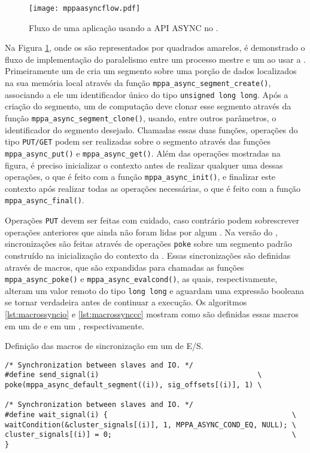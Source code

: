 \begin{figure}[tb]
  \centering
  \caption{Fluxo de uma aplicação usando a API ASYNC no \mppa.}
  \label{fig:mppaasyncflow}
  \texttt{[image: mppaasyncflow.pdf]}
\end{figure}

Na Figura \ref{fig:mppaasyncflow}, onde os \clusters são representados por quadrados amarelos, é demonstrado o fluxo de implementação do paralelismo entre um processo mestre e um \CC ao usar a \ASYNC. Primeiramente um \cluster de \IO cria um segmento sobre uma porção de dados localizados na sua memória local através da função \texttt{mppa\_async\_segment\_create()}, associando a ele um identificador único do tipo \texttt{unsigned long long}. Após a criação do segmento, um \cluster de computação deve clonar esse segmento através da função \texttt{mppa\_async\_segment\_clone()}, usando, entre outros parâmetros, o identificador do segmento desejado. Chamadas essas duas funções, operações do tipo \texttt{PUT/GET} podem ser realizadas sobre o segmento através das funções \texttt{mppa\_async\_put()} e \texttt{mppa\_async\_get()}. Além das operações mostradas na figura, é preciso inicializar o contexto antes de realizar qualquer uma dessas operações, o que é feito com a função \texttt{mppa\_async\_init()}, e finalizar este contexto após realizar todas as operações necessárias, o que é feito com a função \texttt{mppa\_async\_final()}.

Operações \texttt{PUT} devem ser feitas com cuidado, caso contrário podem sobrescrever operações anteriores que ainda não foram lidas por algum \cluster. Na versão \ASYNC do \capb, sincronizações são feitas através de operações \texttt{poke} sobre um segmento padrão construído na inicialização do contexto da \API. Essas sincronizações são definidas através de macros, que são expandidas para chamadas as funções \texttt{mppa\_async\_poke()} e \texttt{mppa\_async\_evalcond()}, as quais, respectivamente, alteram um valor remoto do tipo \texttt{long long} e aguardam uma expressão booleana se tornar verdadeira antes de continuar a execução. Os algoritmos \ref{lst:macrossyncio} e \ref{lst:macrossynccc} mostram como são definidas essas macros em um \cluster de \IO e em um \CC, respectivamente.

\begin{listing}[tb]
\caption{Definição das macros de sincronização em um \cluster de E/S.}
\label{lst:macrossyncio}
\begin{verbatim}
/* Synchronization between slaves and IO. */
#define send_signal(i)                                     \
poke(mppa_async_default_segment((i)), sig_offsets[(i)], 1) \

/* Synchronization between slaves and IO. */
#define wait_signal(i) {                                           \
waitCondition(&cluster_signals[(i)], 1, MPPA_ASYNC_COND_EQ, NULL); \
cluster_signals[(i)] = 0;                                          \
}   
\end{verbatim}
\fonte{o autor.}
\end{listing}

